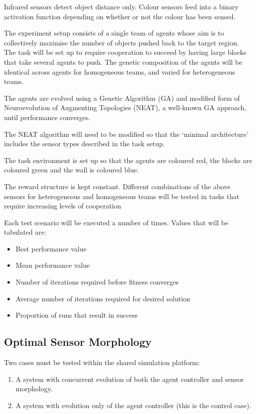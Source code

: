 \documentclass[a4paper,12pt]{article}
\begin{document}
Infrared sensors detect object distance only. Colour sensors feed into a binary activation function depending on whether or not the colour has been sensed.

The experiment setup consists of a single team of agents whose aim is to collectively maximise the number of objects pushed back to the target region. The task will be set up to require cooperation to succeed by having large blocks that take several agents to push. The genetic composition of the agents will be identical across agents for homogeneous teams, and varied for heterogeneous teams.

The agents are evolved using a Genetic Algorithm (GA) and modified form of Neuroevolution of Augmenting Topologies (NEAT), a well-known GA approach\cite{Stanley02}, until performance converges.

The NEAT algorithm will need to be modified so that the ‘minimal architecture’ includes the sensor types described in the task setup.

The task environment is set up so that the agents are coloured red, the blocks are coloured green and the wall is coloured blue.

The reward structure is kept constant. Different combinations of the above sensors for heterogeneous and homogeneous teams will be tested in tasks that require increasing levels of cooperation

Each test scenario will be executed a number of times. Values that will be tabulated are:
\begin{itemize}
\item Best performance value
\item Mean performance value
\item Number of iterations required before fitness converges
\item Average number of iterations required for desired solution
\item Proportion of runs that result in success
\end{itemize}

\subsection{Optimal Sensor Morphology}

Two cases must be tested within the shared simulation platform:
\begin{enumerate}
\item A system with concurrent evolution of both the agent controller and sensor morphology.
\item A system with evolution only of the agent controller (this is the control case).
\end{enumerate}
\end{document}
